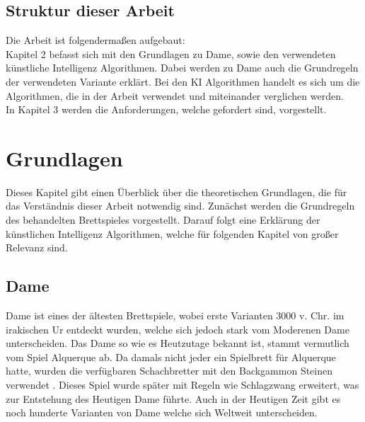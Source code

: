 \documentclass[12pt,a4paper,bibliography=totocnumbered,listof=totocnumbered]{article}
\begin{document}
\subsection{Struktur dieser Arbeit}
Die Arbeit ist folgendermaßen aufgebaut: \\
Kapitel 2 befasst sich mit den Grundlagen zu Dame, sowie den verwendeten 
künstliche Intelligenz Algorithmen. Dabei werden zu Dame auch die Grundregeln der
verwendeten Variante erklärt. Bei den KI Algorithmen handelt es sich um die Algorithmen, die in 
der Arbeit verwendet und miteinander verglichen werden. \\
In Kapitel 3 werden die Anforderungen, welche gefordert sind, vorgestellt.

\pagebreak
\section{Grundlagen}
\label{chap:Grundlagen}
Dieses Kapitel gibt einen Überblick über die theoretischen Grundlagen, die für das Verständnis 
dieser Arbeit notwendig sind. Zunächst werden die Grundregeln des behandelten Brettspieles 
vorgestellt. Darauf folgt eine Erklärung der künstlichen Intelligenz Algorithmen, welche für 
folgenden Kapitel von großer Relevanz sind. \cite{KuenstlicheIntelligenzNorvig}

\subsection{Dame}
Dame ist eines der ältesten Brettspiele, wobei erste Varianten 3000 v. Chr. im irakischen Ur
entdeckt wurden, welche sich jedoch stark vom Moderenen Dame unterscheiden. Das Dame so wie es Heutzutage 
bekannt ist, stammt vermutlich vom Spiel Alquerque ab. Da damals nicht jeder ein Spielbrett für Alquerque 
hatte, wurden die verfügbaren Schachbretter mit den Backgammon Steinen verwendet \cite{SpieleDerWelt}.
Dieses Spiel wurde später mit Regeln wie Schlagzwang erweitert, was zur Entstehung des Heutigen Dame führte.
Auch in der Heutigen Zeit gibt es noch hunderte Varianten von Dame welche sich Weltweit unterscheiden.
\end{document}
